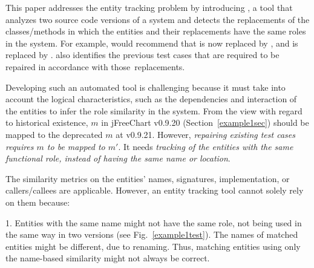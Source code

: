 This paper addresses the entity tracking problem by introducing
{\tool}, a tool that analyzes two source code versions of a
system and detects the replacements of the classes/methods in which
the entities and their replacements have the same roles in the
system. For example, {\tool} would recommend that
 is now replaced by , and
 is replaced by
. {\tool} also identifies the
previous test cases that are required to be repaired in
accordance with those~replacements.


Developing such an automated tool is challenging because it must take
into account the logical characteristics, such as the dependencies and
interaction of the entities to infer the role similarity in the
system. 
From the view with regard to historical existence, $m$ in jFreeChart
v0.9.20 (Section~\ref{example1sec}) should be mapped to the deprecated
$m$ at v0.9.21. However, {\em repairing existing test cases requires
  $m$ to be mapped to $m'$}. It needs {\em tracking of the entities
  with the same functional role, instead of having the same name or
  location}.

The similarity metrics on the entities' names, signatures,
implementation, or callers/callees are applicable. However, an
entity tracking tool cannot solely rely on them because:

1. Entities with the same name might not have the same role, \ie not
  being used in the same way in two versions (see
  Fig.~\ref{example1test}). The names of matched entities might be
  different, \eg due to renaming. Thus, matching entities using only
  the name-based similarity might not always be correct.


